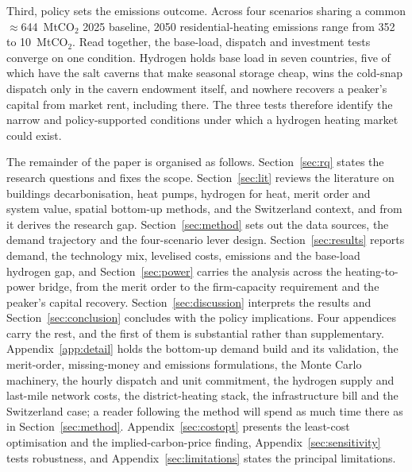 Third, policy sets the emissions outcome. Across four
scenarios sharing a common $\approx$644~MtCO$_2$ 2025 baseline, 2050
residential-heating emissions range from 352 to 10~MtCO$_2$. Read together, the
base-load, dispatch and investment tests converge on one condition. Hydrogen holds
base load in seven countries, five of which have the salt caverns that make seasonal
storage cheap, wins the cold-snap dispatch only in the cavern endowment itself, and
nowhere recovers a peaker's capital from market rent, including there. The three tests
therefore identify the narrow and policy-supported conditions under which a hydrogen
heating market could exist.

The remainder of the paper is organised as follows. Section~\ref{sec:rq} states the
research questions and fixes the scope. Section~\ref{sec:lit} reviews the literature
on buildings decarbonisation, heat pumps, hydrogen for heat, merit order and system
value, spatial bottom-up methods, and the Switzerland context, and from it derives
the research gap. Section~\ref{sec:method} sets out the data sources, the demand trajectory and the
four-scenario lever design. Section~\ref{sec:results} reports demand, the technology
mix, levelised costs, emissions and the base-load hydrogen gap, and
Section~\ref{sec:power} carries the analysis across the heating-to-power bridge, from
the merit order to the firm-capacity requirement and the peaker's capital recovery.
Section~\ref{sec:discussion} interprets the results and Section~\ref{sec:conclusion}
concludes with the policy implications. Four appendices carry the rest, and the first of
them is substantial rather than supplementary. Appendix~\ref{app:detail} holds the
bottom-up demand build and its validation, the merit-order, missing-money and emissions
formulations, the Monte Carlo machinery, the hourly dispatch and unit commitment, the
hydrogen supply and last-mile network costs, the district-heating stack, the
infrastructure bill and the Switzerland case; a reader following the method will spend
as much time there as in Section~\ref{sec:method}. Appendix~\ref{sec:costopt} presents
the least-cost optimisation and the implied-carbon-price finding,
Appendix~\ref{sec:sensitivity} tests robustness, and Appendix~\ref{sec:limitations}
states the principal limitations.
